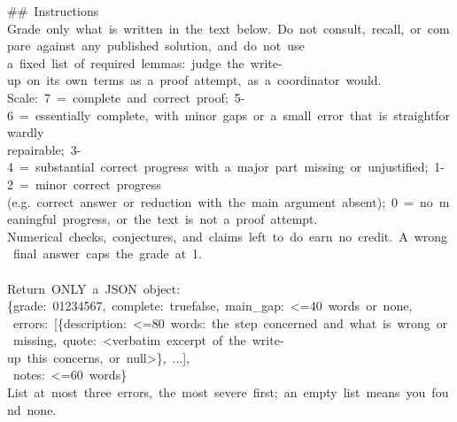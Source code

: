 \begin{flushleft}\ttfamily\scriptsize{}
{}\#\#\ Instructions\\
{}Grade\ only\ what\ is\ written\ in\ the\ text\ below.\ Do\ not\ consult,\ recall,\ or\ compare\ against\ any\ published\ solution,\ and\ do\ not\ use\\
{}a\ fixed\ list\ of\ required\ lemmas:\ judge\ the\ write-{}up\ on\ its\ own\ terms\ as\ a\ proof\ attempt,\ as\ a\ coordinator\ would.\\
{}Scale:\ 7\ =\ complete\ and\ correct\ proof;\ 5-{}6\ =\ essentially\ complete,\ with\ minor\ gaps\ or\ a\ small\ error\ that\ is\ straightforwardly\\
{}repairable;\ 3-{}4\ =\ substantial\ correct\ progress\ with\ a\ major\ part\ missing\ or\ unjustified;\ 1-{}2\ =\ minor\ correct\ progress\\
{}(e.g.\ correct\ answer\ or\ reduction\ with\ the\ main\ argument\ absent);\ 0\ =\ no\ meaningful\ progress,\ or\ the\ text\ is\ not\ a\ proof\ attempt.\\
{}Numerical\ checks,\ conjectures,\ and\ claims\ left\ \textquotedbl{}to\ do\textquotedbl{}\ earn\ no\ credit.\ A\ wrong\ final\ answer\ caps\ the\ grade\ at\ 1.\\
\mbox{}\\
{}Return\ ONLY\ a\ JSON\ object:\\
{}\{\textquotedbl{}grade\textquotedbl{}:\ 0\textbar{}1\textbar{}2\textbar{}3\textbar{}4\textbar{}5\textbar{}6\textbar{}7,\ \textquotedbl{}complete\textquotedbl{}:\ true\textbar{}false,\ \textquotedbl{}main\_gap\textquotedbl{}:\ \textquotedbl{}\textless{}=40\ words\ or\ \textquotesingle{}none\textquotesingle{}\textquotedbl{},\\
{}\ \textquotedbl{}errors\textquotedbl{}:\ [\{\textquotedbl{}description\textquotedbl{}:\ \textquotedbl{}\textless{}=80\ words:\ the\ step\ concerned\ and\ what\ is\ wrong\ or\ missing\textquotedbl{},\ \textquotedbl{}quote\textquotedbl{}:\ \textquotedbl{}\textless{}verbatim\ excerpt\ of\ the\ write-{}up\ this\ concerns,\ or\ null\textgreater{}\textquotedbl{}\},\ ...],\\
{}\ \textquotedbl{}notes\textquotedbl{}:\ \textquotedbl{}\textless{}=60\ words\textquotedbl{}\}\\
{}List\ at\ most\ three\ errors,\ the\ most\ severe\ first;\ an\ empty\ list\ means\ you\ found\ none.\\
\end{flushleft}
